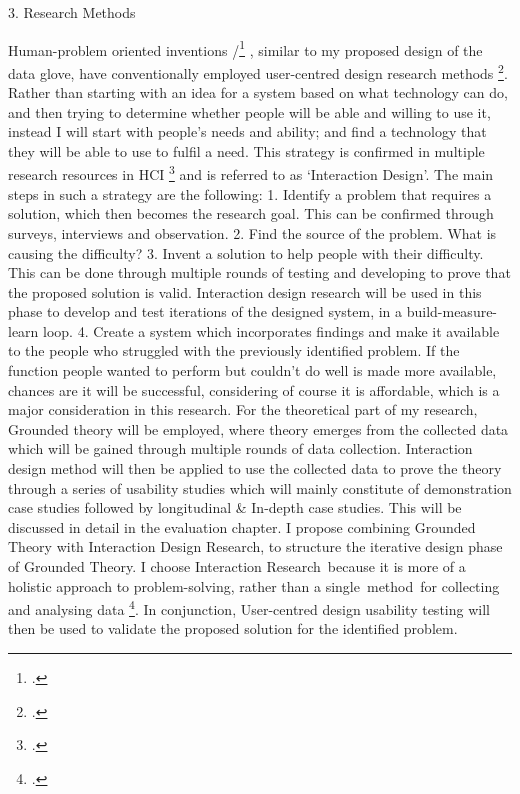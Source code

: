 3. Research Methods

Human-problem oriented inventions /\footcite{Cox2008} , similar to my proposed design of the data glove, have conventionally employed user-centred design research methods \footcite{Bevan1999}. Rather than starting with an idea for a system based on what technology can do, and then trying to determine whether people will be able and willing to use it, instead I will start with people's needs and ability; and find a technology that they will be able to use to fulfil a need. This strategy is confirmed in multiple research resources in HCI \footcite{Dix2004} and is referred to as ‘Interaction Design’.    
The main steps in such a strategy are the following: 
1.	Identify a problem that requires a solution, which then becomes the research goal.  This can be confirmed through surveys, interviews and observation. 
2.	Find the source of the problem. What is causing the difficulty?
3.	Invent a solution to help people with their difficulty. This can be done through multiple rounds of testing and developing to prove that the proposed solution is valid. Interaction design research will be used in this phase to develop and test iterations of the designed system, in a build-measure-learn loop.
4.	Create a system which incorporates findings and make it available to the people who struggled with the previously identified problem. If the function people wanted to perform but couldn't do well is made more available, chances are it will be successful, considering of course it is affordable, which is a major consideration in this research. 
For the theoretical part of my research, Grounded theory will be employed, where theory emerges from the collected data which will be gained through multiple rounds of data collection.  Interaction design method will then be applied to use the collected data to prove the theory through a series of usability studies which will mainly constitute of demonstration case studies followed by longitudinal \& In-depth case studies. This will be discussed in detail in the evaluation chapter.
I propose combining Grounded Theory with Interaction Design Research, to structure the iterative design phase of Grounded Theory.  I choose Interaction Research because it is more of a holistic approach to problem-solving, rather than a single method for collecting and analysing data \footcite{OBrienRoryFacultyofInformationStudies2001}. In conjunction, User-centred design usability testing will then be used to validate the proposed solution for the identified problem. 

